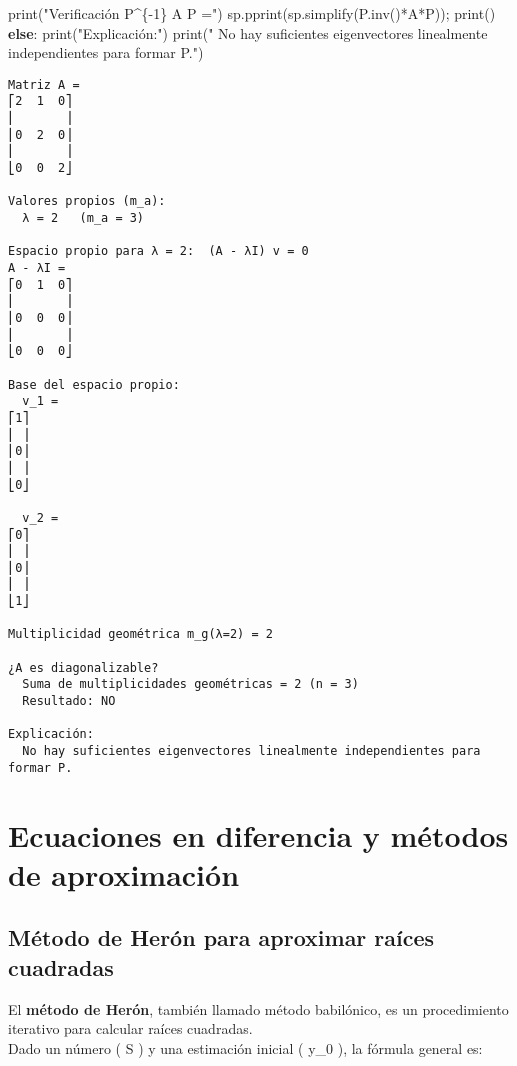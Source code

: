 \documentclass[
  letterpaper,
  DIV=11,
  numbers=noendperiod]{scrreprt}
\newenvironment{Shaded}{\begin{snugshade}}{\end{snugshade}}
\newcommand{\BuiltInTok}[1]{\textcolor[rgb]{0.00,0.23,0.31}{#1}}
\newcommand{\ControlFlowTok}[1]{\textcolor[rgb]{0.00,0.23,0.31}{\textbf{#1}}}
\newcommand{\NormalTok}[1]{\textcolor[rgb]{0.00,0.23,0.31}{#1}}
\newcommand{\OperatorTok}[1]{\textcolor[rgb]{0.37,0.37,0.37}{#1}}
\newcommand{\StringTok}[1]{\textcolor[rgb]{0.13,0.47,0.30}{#1}}
\begin{document}
\begin{Shaded}
\begin{Highlighting}[]
    \BuiltInTok{print}\NormalTok{(}\StringTok{"Verificación P\^{}\{{-}1\} A P ="}\NormalTok{)}
\NormalTok{    sp.pprint(sp.simplify(P.inv()}\OperatorTok{*}\NormalTok{A}\OperatorTok{*}\NormalTok{P))}\OperatorTok{;} \BuiltInTok{print}\NormalTok{()}
\ControlFlowTok{else}\NormalTok{:}
    \BuiltInTok{print}\NormalTok{(}\StringTok{"Explicación:"}\NormalTok{)}
    \BuiltInTok{print}\NormalTok{(}\StringTok{"  No hay suficientes eigenvectores linealmente independientes para formar P."}\NormalTok{)}
\end{Highlighting}
\end{Shaded}

\begin{verbatim}
Matriz A =
⎡2  1  0⎤
⎢       ⎥
⎢0  2  0⎥
⎢       ⎥
⎣0  0  2⎦

Valores propios (m_a):
  λ = 2   (m_a = 3)

Espacio propio para λ = 2:  (A - λI) v = 0
A - λI =
⎡0  1  0⎤
⎢       ⎥
⎢0  0  0⎥
⎢       ⎥
⎣0  0  0⎦

Base del espacio propio:
  v_1 = 
⎡1⎤
⎢ ⎥
⎢0⎥
⎢ ⎥
⎣0⎦

  v_2 = 
⎡0⎤
⎢ ⎥
⎢0⎥
⎢ ⎥
⎣1⎦

Multiplicidad geométrica m_g(λ=2) = 2

¿A es diagonalizable?
  Suma de multiplicidades geométricas = 2 (n = 3)
  Resultado: NO

Explicación:
  No hay suficientes eigenvectores linealmente independientes para formar P.
\end{verbatim}


\chapter{Ecuaciones en diferencia y métodos de
aproximación}\label{ecuaciones-en-diferencia-y-muxe9todos-de-aproximaciuxf3n}

\section{Método de Herón para aproximar raíces
cuadradas}\label{muxe9todo-de-heruxf3n-para-aproximar-rauxedces-cuadradas}

El \textbf{método de Herón}, también llamado método babilónico, es un
procedimiento iterativo para calcular raíces cuadradas.\\
Dado un número ( S ) y una estimación inicial ( y\_0 ), la fórmula
general es:
\end{document}

